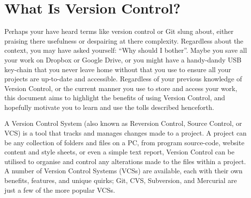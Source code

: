 \documentclass[10pt, a4paper, titlepage]{article}
\begin{document}
\tableofcontents 
\pagebreak


\section{What Is Version Control?}
Perhaps your have heard terms like version control or Git slung about, either
praising there usefulness or despairing at there complexity. 
Regardless about the context, you may have asked yourself: 
``Why should I bother''.
Maybe you save all your work on Dropbox or Google Drive, or you might have a
handy-dandy USB key-chain that you never leave home without that you use to
ensure all your projects are up-to-date and accessible.
Regardless of your previous knowledge of Version Control, or the current
manner you use to store and access your work, this document aims to highlight
the benefits of using Version Control, and hopefully motivate you to learn and
use the tolls described henceforth.

A Version Control System (also known as Reversion Control, Source Control, or
VCS) is a tool that tracks and manages changes made to a project.  
A project can be any collection of folders and files on a PC, from program
source-code, website content and style sheets, or even a simple text report,
Version Control can be utilised to organise and control any alterations made
to the files within a project. 
A number of Version Control Systems (VCSs) are available, each with their own
benefits, features, and unique quirks; Git, CVS, Subversion, and Mercurial are
just a few of the more popular VCSs.
\end{document}

